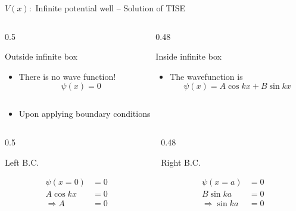\begin{frame}{\(V(x) :\) Infinite potential well -- Solution of TISE}
	\begin{columns}[t]
		\begin{column}[t]{0.5\textwidth}
			\begin{center}
				Outside infinite box
			\end{center}
			\begin{itemize}
				\item There is no wave function!
				\[
				\psi(x) = 0 
				\]
			\end{itemize}
		\end{column}
		\begin{column}[t]{0.48\textwidth}
			\begin{center}
				Inside infinite box
			\end{center}
			\begin{itemize}
				\item The wavefunction is
				\[
				\psi(x)  = A \cos k x + B \sin k x
				\]
			\end{itemize}
		\end{column}
	\end{columns}
	\begin{itemize}
		\item Upon applying boundary conditions
	\end{itemize}
	\begin{columns}[t]
		\begin{column}[t]{0.5\textwidth}
			\begin{center}
				Left B.C.
			\end{center}
			\begin{align*}
				\psi(x=0) &= 0	\\
				A \cos k x &= 0 \\
				\Rightarrow A &= 0
			\end{align*}
		\end{column}
		\begin{column}[t]{0.48\textwidth}
			\begin{center}
				Right B.C.
			\end{center}
			\begin{align*}
				\psi(x=a) &= 0 \\
				B \sin k a &= 0 \\
				\Rightarrow \sin k a &= 0
			\end{align*}
		\end{column}
	\end{columns}
\end{frame}
